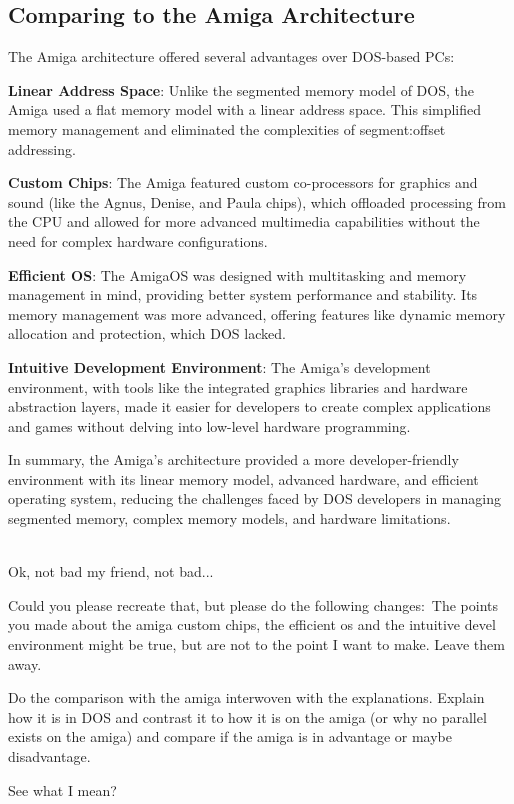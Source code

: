 \documentclass[a4paper]{article}
\begin{document}
\subsection*{Comparing to the Amiga Architecture}
The Amiga architecture offered several advantages over DOS-based PCs:
\begin{itemize}
  \begin{item}
    \textbf{Linear Address Space}: Unlike the segmented memory model of DOS, the Amiga used a flat memory model with a linear address space. This simplified memory management and eliminated the complexities of segment:offset addressing.
  \end{item}
  \begin{item}
    \textbf{Custom Chips}: The Amiga featured custom co-processors for graphics and sound (like the Agnus, Denise, and Paula chips), which offloaded processing from the CPU and allowed for more advanced multimedia capabilities without the need for complex hardware configurations.
  \end{item}
  \begin{item}
    \textbf{Efficient OS}: The AmigaOS was designed with multitasking and memory management in mind, providing better system performance and stability. Its memory management was more advanced, offering features like dynamic memory allocation and protection, which DOS lacked.
  \end{item}
  \begin{item}
    \textbf{Intuitive Development Environment}: The Amiga's development environment, with tools like the integrated graphics libraries and hardware abstraction layers, made it easier for developers to create complex applications and games without delving into low-level hardware programming.
  \end{item}
\end{itemize}
In summary, the Amiga's architecture provided a more developer-friendly environment with its linear memory model, advanced hardware, and efficient operating system, reducing the challenges faced by DOS developers in managing segmented memory, complex memory models, and hardware limitations.
\begin{dialogue}
 \leavevmode\\
Ok, not bad my friend, not bad...

Could you please recreate that, but please do the following changes:\
The points you made about the amiga custom chips, the efficient os and the intuitive devel environment might be true, but are not to the point I want to make. Leave them away.

Do the comparison with the amiga interwoven with the explanations. Explain how it is in DOS and contrast it to how it is on the amiga (or why no parallel exists on the amiga) and compare if the amiga is in advantage or maybe disadvantage.

See what I mean?
 \leavevmode\\
 \leavevmode\\
\end{dialogue}
\end{document}
